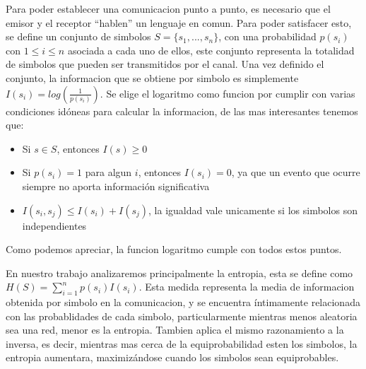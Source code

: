 Para poder establecer una comunicacion punto a punto, es necesario que el emisor y el receptor "`hablen"' un lenguaje en comun. Para poder satisfacer esto, se define un conjunto de simbolos $S = \{ s_1, ..., s_n \}$, con una probabilidad $p(s_i)$ con $1 \leq i \leq n$ asociada a cada uno de ellos, este conjunto representa la totalidad de simbolos que pueden ser transmitidos por el canal. Una vez definido el conjunto, la informacion que se obtiene por simbolo es simplemente $I(s_i) = log(\frac{1}{p(s_i)})$. Se elige el logaritmo como funcion por cumplir con varias condiciones idóneas para calcular la informacion, de las mas interesantes tenemos que:

\begin{itemize}
	\item Si $s \in S$, entonces $I(s) \geq 0$
	\item Si $p(s_i) = 1$ para algun $i$, entonces $I(s_i) = 0$, ya que un evento que ocurre siempre no aporta información significativa
	\item $I(s_i, s_j) \leq I(s_i) + I(s_j)$, la igualdad vale unicamente si los simbolos son independientes
\end{itemize}

Como podemos apreciar, la funcion logaritmo cumple con todos estos puntos.

En nuestro trabajo analizaremos principalmente la entropia, esta se define como $H(S) = \sum\limits_{i=1}^n p(s_i)I(s_i)$. Esta medida representa la media de informacion obtenida por simbolo en la comunicacion, y se encuentra íntimamente relacionada con las probablidades de cada simbolo, particularmente mientras menos aleatoria sea una red, menor es la entropia. Tambien aplica el mismo razonamiento a la inversa, es decir, mientras mas cerca de la equiprobabilidad esten los simbolos, la entropia aumentara, maximizándose cuando los simbolos sean equiprobables.


